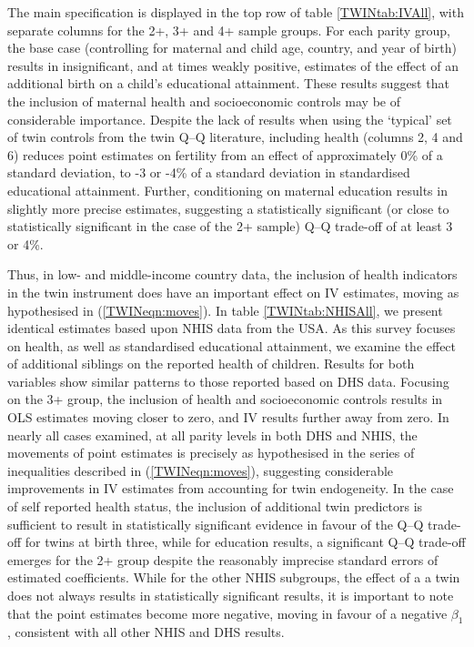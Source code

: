 The main specification is displayed in the top row of table \ref{TWINtab:IVAll}, 
with separate columns for the 2+, 3+ and 4+ sample groups. For each parity 
group, the base case (controlling for maternal and child age, country, and year 
of birth) results in insignificant, and at times weakly positive, estimates of 
the effect of an additional birth on a child's educational attainment. These 
results suggest that the inclusion of maternal health and socioeconomic controls 
may be of considerable importance. Despite the lack of results when using
the `typical' set of twin controls from the twin Q--Q literature, including 
health (columns 2, 4 and 6) reduces point estimates on fertility from an effect 
of approximately 0\% of a standard deviation, to -3 or -4\% of a standard 
deviation in standardised educational attainment. Further, conditioning on 
maternal education results in slightly more precise estimates, suggesting a 
statistically significant (or close to statistically significant in the case
of the 2+ sample) Q--Q trade-off of at least 3 or 4\%.

Thus, in low- and middle-income country data, the inclusion of health 
indicators in the twin instrument does have an important effect on IV 
estimates, moving as hypothesised in (\ref{TWINeqn:moves}).  In table 
\ref{TWINtab:NHISAll}, we present identical estimates based upon NHIS data from
the USA. As this survey focuses on health, as well as standardised educational 
attainment, we examine the effect of additional siblings on the reported health
of children. Results for both variables show similar patterns to those reported 
based on DHS data.  Focusing on the 3+ group, the inclusion of health and 
socioeconomic controls results in OLS estimates moving closer to zero, and IV 
results further away from zero. In nearly all cases examined, at all parity 
levels in both DHS and NHIS, the movements of point estimates is precisely as
 hypothesised in the series of inequalities described in (\ref{TWINeqn:moves}), 
suggesting considerable improvements in IV estimates from accounting for twin
endogeneity.  In the case of self reported health status, the inclusion of 
additional twin predictors is sufficient to result in statistically significant 
evidence in favour of the Q--Q trade-off for twins at birth three, while for
education results, a significant Q--Q trade-off emerges for the 2+ group despite 
the reasonably imprecise standard errors of estimated coefficients. While for 
the other NHIS subgroups, the effect of a a twin does not always results in
statistically significant results, it is important to note that the point 
estimates become more negative, moving in favour of a negative $\beta_1$, 
consistent with all other NHIS and DHS results.

